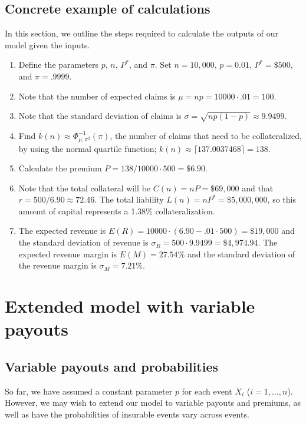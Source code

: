\documentclass[12pt]{article}
\begin{document}
\subsection{Concrete example of calculations}

In this section, we outline the steps required to calculate the outputs of our model given the inputs.

\begin{enumerate}
  \item Define the parameters $p$, $n$, $P^*$, and $\pi$. Set $n=10,000$, $p=0.01$, $P^*=\$500$, and $\pi=.9999$.
  \item Note that the number of expected claims is $\mu = np = 10000\cdot .01 = 100$.
  \item Note that the standard deviation of claims is $\sigma = \sqrt{np(1-p)} \approx 9.9499$.
  \item Find $k(n) \approx \Phi^{-1}_{\mu,\sigma^2}(\pi)$, the number of claims that need to be collateralized, by using the normal quartile function; $k(n) \approx \lceil137.0037468\rceil = 138$.
  \item Calculate the premium $P=138/10000\cdot 500 = \$6.90$.
  \item Note that the total collateral will be $C(n) = nP = \$69,000$ and that $r = 500/6.90 \approx 72.46$. The total liability $L(n) = nP^* = \$5,000,000$, so this amount of capital represents a 1.38\% collateralization.
  \item The expected revenue is $E(R) =10000\cdot(6.90-.01\cdot 500)= \$19,000$ and the standard deviation of revenue is $\sigma_R = 500 \cdot 9.9499 = \$4,974.94$. The expected revenue margin is $E(M) = 27.54\%$ and the standard deviation of the revenue margin is $\sigma_M = 7.21\%$.
\end{enumerate}

\section{Extended model with variable payouts}

\subsection{Variable payouts and probabilities}

So far, we have assumed a constant parameter $p$ for each event $X_i$ ($i=1,\ldots,n$). However, we may wish to extend our model to variable payouts and premiums, as well as have the probabilities of insurable events vary across events.
\end{document}
